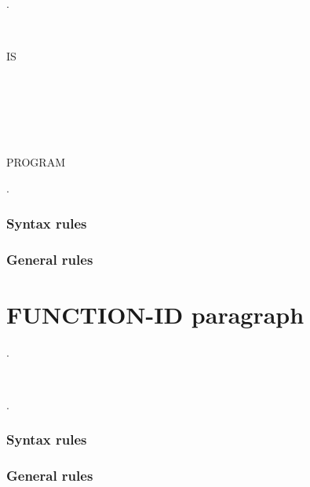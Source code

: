 \begin{syntax}
  .
  \begin{1=}
     \\
    \literal
  \end{1=}
  \begin{0-1}  \literal \end{0-1}

  \begin{0-1} IS
    \begin{1=}
      \begin{1+}
         \\

        \begin{1=}
           \\
        \end{1=}
      \end{1+} \\

    \end{1=}
    PROGRAM
  \end{0-1}.
\end{syntax}

\subsubsection{Syntax rules}

\subsubsection{General rules}

\section{FUNCTION-ID paragraph}

\begin{syntax}
  .
  \begin{1=}
    \functionname \\
    \literal
  \end{1=}
  \begin{0-1}  \literal \end{0-1}.
\end{syntax}

\subsubsection{Syntax rules}

\subsubsection{General rules}


